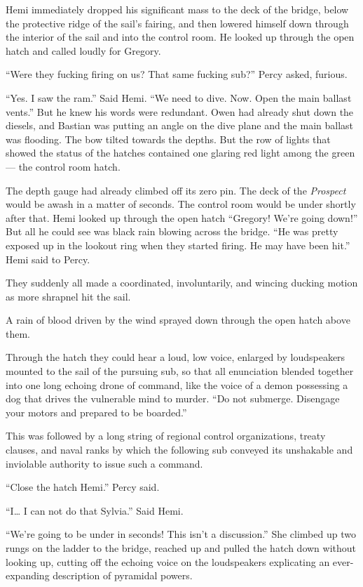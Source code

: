 \documentclass[
]{scrbook}
\begin{document}
Hemi immediately dropped his significant mass to the deck of the bridge,
below the protective ridge of the sail's fairing, and then lowered
himself down through the interior of the sail and into the control room.
He looked up through the open hatch and called loudly for Gregory.

``Were they fucking firing on us? That same fucking sub?'' Percy asked,
furious.

``Yes. I saw the ram.'' Said Hemi. ``We need to dive. Now. Open the main
ballast vents.'' But he knew his words were redundant. Owen had already
shut down the diesels, and Bastian was putting an angle on the dive
plane and the main ballast was flooding. The bow tilted towards the
depths. But the row of lights that showed the status of the hatches
contained one glaring red light among the green --- the control room
hatch.

The depth gauge had already climbed off its zero pin. The deck of the
\emph{Prospect} would be awash in a matter of seconds. The control room
would be under shortly after that. Hemi looked up through the open hatch
``Gregory! We're going down!'' But all he could see was black rain
blowing across the bridge. ``He was pretty exposed up in the lookout
ring when they started firing. He may have been hit.'' Hemi said to
Percy.

They suddenly all made a coordinated, involuntarily, and wincing ducking
motion as more shrapnel hit the sail.

A rain of blood driven by the wind sprayed down through the open hatch
above them.

Through the hatch they could hear a loud, low voice, enlarged by
loudspeakers mounted to the sail of the pursuing sub, so that all
enunciation blended together into one long echoing drone of command,
like the voice of a demon possessing a dog that drives the vulnerable
mind to murder. ``Do not submerge. Disengage your motors and prepared to
be boarded.''

This was followed by a long string of regional control organizations,
treaty clauses, and naval ranks by which the following sub conveyed its
unshakable and inviolable authority to issue such a command.

``Close the hatch Hemi.'' Percy said.

``I\ldots{} I can not do that Sylvia.'' Said Hemi.

``We're going to be under in seconds! This isn't a discussion.'' She
climbed up two rungs on the ladder to the bridge, reached up and pulled
the hatch down without looking up, cutting off the echoing voice on the
loudspeakers explicating an ever-expanding description of pyramidal
powers.
\end{document}
